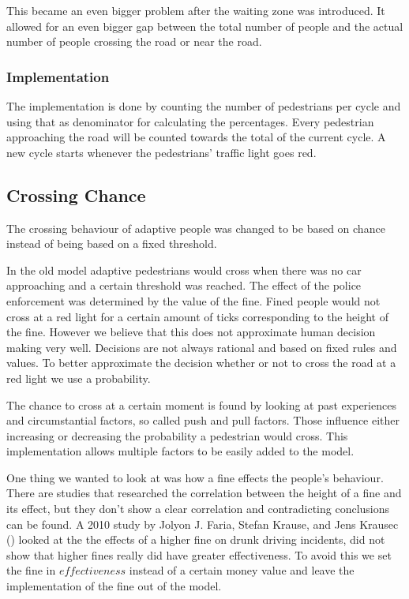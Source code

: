 \documentclass[a4paper]{article}
\begin{document}
This became an even bigger problem after the waiting zone was introduced. It allowed for an even bigger gap between the total number of people and the actual number of people crossing the road or near the road.

\subsubsection{Implementation}
The implementation is done by counting the number of pedestrians per cycle and using that as denominator for calculating the percentages. Every pedestrian approaching the road will be counted towards the total of the current cycle. A new cycle starts whenever the pedestrians' traffic light goes red.


\subsection{Crossing Chance}
The crossing behaviour of adaptive people was changed to be based on chance instead of being based on a fixed threshold.

In the old model adaptive pedestrians would cross when there was no car approaching and a certain threshold was reached. The effect of the police enforcement was determined by the value of the fine. Fined people would not cross at a red light for a certain amount of ticks corresponding to the height of the fine. However we believe that this does not approximate human decision making very well. Decisions are not always rational and based on fixed rules and values. To better approximate the decision whether or not to cross the road at a red light we use a probability. 

The chance to cross at a certain moment is found by looking at past experiences and circumstantial factors, so called push and pull factors. Those influence either increasing or decreasing the probability a pedestrian would cross. This implementation allows multiple factors to be easily added to the model.


One thing we wanted to look at was how a fine effects the people's behaviour. There are studies that researched the correlation between the height of a fine and its effect, but they don't show a clear correlation and contradicting conclusions can be found. A 2010 study by Jolyon J. Faria, Stefan Krause, and Jens Krausec (\cite{drunkdrivers}) looked at the the effects of a higher fine on drunk driving incidents, did not show that higher fines really did have greater effectiveness. To avoid this we set the fine in $effectiveness$ instead of a certain money value and leave the implementation of the fine out of the model. 
\end{document}
